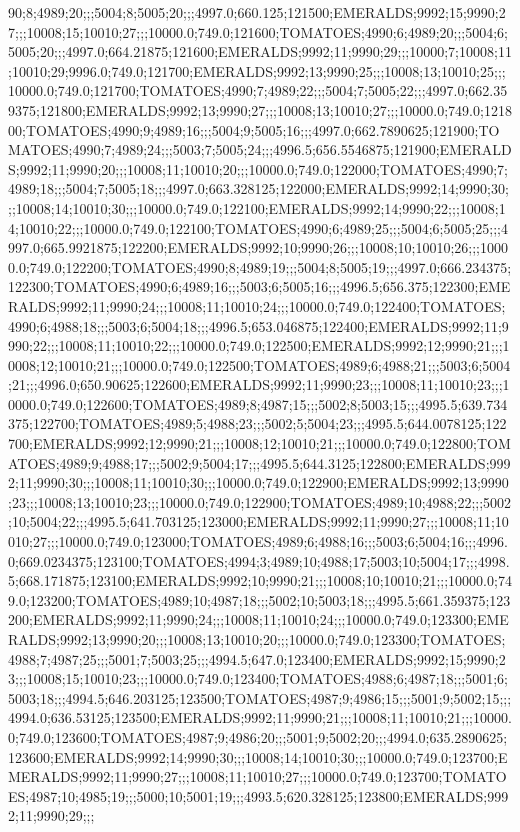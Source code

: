 90;8;4989;20;;;5004;8;5005;20;;;4997.0;660.125;121500;EMERALDS;9992;15;9990;27;;;10008;15;10010;27;;;10000.0;749.0;121600;TOMATOES;4990;6;4989;20;;;5004;6;5005;20;;;4997.0;664.21875;121600;EMERALDS;9992;11;9990;29;;;10000;7;10008;11;10010;29;9996.0;749.0;121700;EMERALDS;9992;13;9990;25;;;10008;13;10010;25;;;10000.0;749.0;121700;TOMATOES;4990;7;4989;22;;;5004;7;5005;22;;;4997.0;662.359375;121800;EMERALDS;9992;13;9990;27;;;10008;13;10010;27;;;10000.0;749.0;121800;TOMATOES;4990;9;4989;16;;;5004;9;5005;16;;;4997.0;662.7890625;121900;TOMATOES;4990;7;4989;24;;;5003;7;5005;24;;;4996.5;656.5546875;121900;EMERALDS;9992;11;9990;20;;;10008;11;10010;20;;;10000.0;749.0;122000;TOMATOES;4990;7;4989;18;;;5004;7;5005;18;;;4997.0;663.328125;122000;EMERALDS;9992;14;9990;30;;;10008;14;10010;30;;;10000.0;749.0;122100;EMERALDS;9992;14;9990;22;;;10008;14;10010;22;;;10000.0;749.0;122100;TOMATOES;4990;6;4989;25;;;5004;6;5005;25;;;4997.0;665.9921875;122200;EMERALDS;9992;10;9990;26;;;10008;10;10010;26;;;10000.0;749.0;122200;TOMATOES;4990;8;4989;19;;;5004;8;5005;19;;;4997.0;666.234375;122300;TOMATOES;4990;6;4989;16;;;5003;6;5005;16;;;4996.5;656.375;122300;EMERALDS;9992;11;9990;24;;;10008;11;10010;24;;;10000.0;749.0;122400;TOMATOES;4990;6;4988;18;;;5003;6;5004;18;;;4996.5;653.046875;122400;EMERALDS;9992;11;9990;22;;;10008;11;10010;22;;;10000.0;749.0;122500;EMERALDS;9992;12;9990;21;;;10008;12;10010;21;;;10000.0;749.0;122500;TOMATOES;4989;6;4988;21;;;5003;6;5004;21;;;4996.0;650.90625;122600;EMERALDS;9992;11;9990;23;;;10008;11;10010;23;;;10000.0;749.0;122600;TOMATOES;4989;8;4987;15;;;5002;8;5003;15;;;4995.5;639.734375;122700;TOMATOES;4989;5;4988;23;;;5002;5;5004;23;;;4995.5;644.0078125;122700;EMERALDS;9992;12;9990;21;;;10008;12;10010;21;;;10000.0;749.0;122800;TOMATOES;4989;9;4988;17;;;5002;9;5004;17;;;4995.5;644.3125;122800;EMERALDS;9992;11;9990;30;;;10008;11;10010;30;;;10000.0;749.0;122900;EMERALDS;9992;13;9990;23;;;10008;13;10010;23;;;10000.0;749.0;122900;TOMATOES;4989;10;4988;22;;;5002;10;5004;22;;;4995.5;641.703125;123000;EMERALDS;9992;11;9990;27;;;10008;11;10010;27;;;10000.0;749.0;123000;TOMATOES;4989;6;4988;16;;;5003;6;5004;16;;;4996.0;669.0234375;123100;TOMATOES;4994;3;4989;10;4988;17;5003;10;5004;17;;;4998.5;668.171875;123100;EMERALDS;9992;10;9990;21;;;10008;10;10010;21;;;10000.0;749.0;123200;TOMATOES;4989;10;4987;18;;;5002;10;5003;18;;;4995.5;661.359375;123200;EMERALDS;9992;11;9990;24;;;10008;11;10010;24;;;10000.0;749.0;123300;EMERALDS;9992;13;9990;20;;;10008;13;10010;20;;;10000.0;749.0;123300;TOMATOES;4988;7;4987;25;;;5001;7;5003;25;;;4994.5;647.0;123400;EMERALDS;9992;15;9990;23;;;10008;15;10010;23;;;10000.0;749.0;123400;TOMATOES;4988;6;4987;18;;;5001;6;5003;18;;;4994.5;646.203125;123500;TOMATOES;4987;9;4986;15;;;5001;9;5002;15;;;4994.0;636.53125;123500;EMERALDS;9992;11;9990;21;;;10008;11;10010;21;;;10000.0;749.0;123600;TOMATOES;4987;9;4986;20;;;5001;9;5002;20;;;4994.0;635.2890625;123600;EMERALDS;9992;14;9990;30;;;10008;14;10010;30;;;10000.0;749.0;123700;EMERALDS;9992;11;9990;27;;;10008;11;10010;27;;;10000.0;749.0;123700;TOMATOES;4987;10;4985;19;;;5000;10;5001;19;;;4993.5;620.328125;123800;EMERALDS;9992;11;9990;29;;;